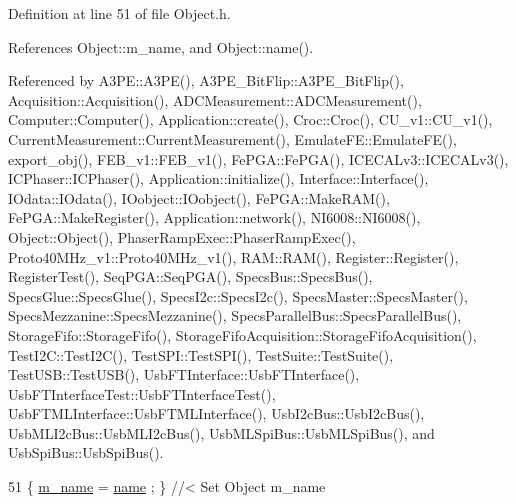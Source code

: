 Definition at line 51 of file Object.\+h.



References Object\+::m\+\_\+name, and Object\+::name().



Referenced by A3\+P\+E\+::\+A3\+P\+E(), A3\+P\+E\+\_\+\+Bit\+Flip\+::\+A3\+P\+E\+\_\+\+Bit\+Flip(), Acquisition\+::\+Acquisition(), A\+D\+C\+Measurement\+::\+A\+D\+C\+Measurement(), Computer\+::\+Computer(), Application\+::create(), Croc\+::\+Croc(), C\+U\+\_\+v1\+::\+C\+U\+\_\+v1(), Current\+Measurement\+::\+Current\+Measurement(), Emulate\+F\+E\+::\+Emulate\+F\+E(), export\+\_\+obj(), F\+E\+B\+\_\+v1\+::\+F\+E\+B\+\_\+v1(), Fe\+P\+G\+A\+::\+Fe\+P\+G\+A(), I\+C\+E\+C\+A\+Lv3\+::\+I\+C\+E\+C\+A\+Lv3(), I\+C\+Phaser\+::\+I\+C\+Phaser(), Application\+::initialize(), Interface\+::\+Interface(), I\+Odata\+::\+I\+Odata(), I\+Oobject\+::\+I\+Oobject(), Fe\+P\+G\+A\+::\+Make\+R\+A\+M(), Fe\+P\+G\+A\+::\+Make\+Register(), Application\+::network(), N\+I6008\+::\+N\+I6008(), Object\+::\+Object(), Phaser\+Ramp\+Exec\+::\+Phaser\+Ramp\+Exec(), Proto40\+M\+Hz\+\_\+v1\+::\+Proto40\+M\+Hz\+\_\+v1(), R\+A\+M\+::\+R\+A\+M(), Register\+::\+Register(), Register\+Test(), Seq\+P\+G\+A\+::\+Seq\+P\+G\+A(), Specs\+Bus\+::\+Specs\+Bus(), Specs\+Glue\+::\+Specs\+Glue(), Specs\+I2c\+::\+Specs\+I2c(), Specs\+Master\+::\+Specs\+Master(), Specs\+Mezzanine\+::\+Specs\+Mezzanine(), Specs\+Parallel\+Bus\+::\+Specs\+Parallel\+Bus(), Storage\+Fifo\+::\+Storage\+Fifo(), Storage\+Fifo\+Acquisition\+::\+Storage\+Fifo\+Acquisition(), Test\+I2\+C\+::\+Test\+I2\+C(), Test\+S\+P\+I\+::\+Test\+S\+P\+I(), Test\+Suite\+::\+Test\+Suite(), Test\+U\+S\+B\+::\+Test\+U\+S\+B(), Usb\+F\+T\+Interface\+::\+Usb\+F\+T\+Interface(), Usb\+F\+T\+Interface\+Test\+::\+Usb\+F\+T\+Interface\+Test(), Usb\+F\+T\+M\+L\+Interface\+::\+Usb\+F\+T\+M\+L\+Interface(), Usb\+I2c\+Bus\+::\+Usb\+I2c\+Bus(), Usb\+M\+L\+I2c\+Bus\+::\+Usb\+M\+L\+I2c\+Bus(), Usb\+M\+L\+Spi\+Bus\+::\+Usb\+M\+L\+Spi\+Bus(), and Usb\+Spi\+Bus\+::\+Usb\+Spi\+Bus().


\begin{DoxyCode}
51 \{ \hyperlink{classObject_a8b83c95c705d2c3ba0d081fe1710f48d}{m\_name}  = \hyperlink{classObject_a300f4c05dd468c7bb8b3c968868443c1}{name}  ; \} \textcolor{comment}{//< Set Object m\_name}
\end{DoxyCode}
\mbox{\label{classProcessus_a831b027b9cf18ab56fa6147b5d3055da}} 
